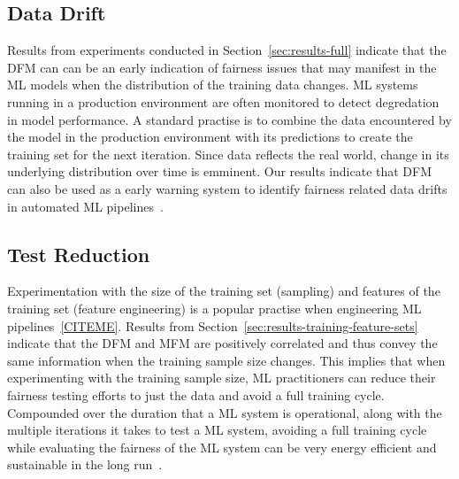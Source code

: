 \documentclass{article}
\begin{document}




\subsection{Data Drift}\label{sec:discuss-data-drift}

Results from experiments conducted in Section \ref{sec:results-full}
indicate that the DFM can can be an early indication of fairness
issues that may manifest in the ML models when the distribution of the
training data changes. ML systems running in a production environment
are often monitored to detect degredation in model performance. A
standard practise is to combine the data encountered by the model in
the production environment with its predictions to create the training
set for the next iteration. Since data reflects the real world, change
in its underlying distribution over time is emminent. Our results
indicate that DFM can also be used as a early warning system to
identify fairness related data drifts in automated ML
pipelines \cite{CITEME}.

\subsection{Test Reduction}\label{sec:discuss-test-red}

Experimentation with the size of the training set (sampling) and
features of the training set (feature engineering) is a popular
practise when engineering ML pipelines \ref{CITEME}. Results from
Section \ref{sec:results-training-feature-sets} indicate that the DFM
and MFM are positively correlated and thus convey the same information
when the training sample size changes. This implies that when
experimenting with the training sample size, ML practitioners can
reduce their fairness testing efforts to just the data and avoid a
full training cycle. Compounded over the duration that a ML system is
operational, along with the multiple iterations it takes to test a ML
system, avoiding a full training cycle while evaluating the fairness
of the ML system can be very energy efficient and sustainable in the
long run \cite{CITME}.
\end{document}
